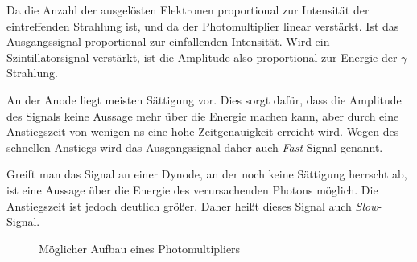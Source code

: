 Da die Anzahl der ausgelösten Elektronen proportional zur Intensität der
eintreffenden Strahlung ist, und da der Photomultiplier linear verstärkt. Ist
das Ausgangssignal proportional zur einfallenden Intensität. Wird ein
Szintillatorsignal verstärkt, ist die Amplitude also proportional zur Energie
der $\gamma$-Strahlung.

An der Anode liegt meisten Sättigung vor. Dies sorgt dafür, dass die Amplitude
des Signals keine Aussage mehr über die Energie machen kann, aber durch eine
Anstiegszeit von wenigen \si{\nano\second} eine hohe Zeitgenauigkeit erreicht
wird. Wegen des schnellen Anstiegs wird das Ausgangssignal daher auch
\emph{Fast}-Signal genannt.

Greift man das Signal an einer Dynode, an der noch keine Sättigung herrscht ab,
ist eine Aussage über die Energie des verursachenden Photons möglich. Die
Anstiegszeit ist jedoch deutlich größer. Daher heißt dieses Signal auch
\emph{Slow}-Signal.

\begin{figure}[htbp]
    \centering
    \caption{%
        Möglicher Aufbau eines Photomultipliers
    }
    \label{fig:PM}
\end{figure}

